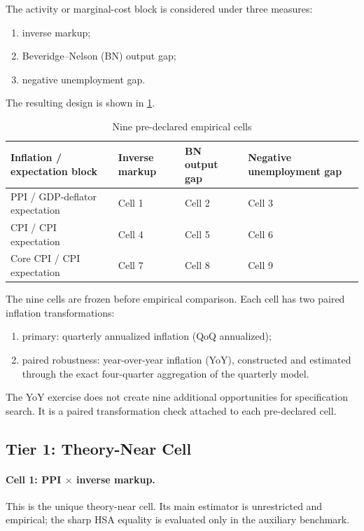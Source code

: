 \documentclass[11pt]{article}
\begin{document}
The activity or marginal-cost block is considered under three measures:
\begin{enumerate}
\item inverse markup;
\item Beveridge--Nelson (BN) output gap;
\item negative unemployment gap.
\end{enumerate}

The resulting design is shown in \cref{tab:nine_cells}.

\begin{table}[htbp]
\centering
\caption{Nine pre-declared empirical cells}
\label{tab:nine_cells}
\begin{tabular}{p{}p{}p{}p{}}
\toprule
Inflation / expectation block & Inverse markup & BN output gap & Negative unemployment gap \\
\midrule
PPI / GDP-deflator expectation & Cell 1 & Cell 2 & Cell 3 \\
CPI / CPI expectation & Cell 4 & Cell 5 & Cell 6 \\
Core CPI / CPI expectation & Cell 7 & Cell 8 & Cell 9 \\
\bottomrule
\end{tabular}
\end{table}

The nine cells are frozen before empirical comparison. Each cell has two paired inflation transformations:
\begin{enumerate}
\item primary: quarterly annualized inflation (QoQ annualized);
\item paired robustness: year-over-year inflation (YoY), constructed and estimated through the exact four-quarter aggregation of the quarterly model.
\end{enumerate}
The YoY exercise does not create nine additional opportunities for specification search. It is a paired transformation check attached to each pre-declared cell.

\subsection{Tier 1: Theory-Near Cell}

\paragraph{Cell 1: PPI \(\times\) inverse markup.}
This is the unique theory-near cell. Its main estimator is unrestricted and empirical; the sharp HSA equality is evaluated only in the auxiliary benchmark.
\end{document}
